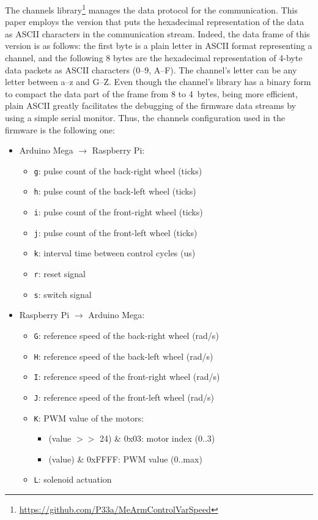 \documentclass[conference]{IEEEtran}
\begin{document}
The channels library\footnote{\url{https://github.com/P33a/MeArmControlVarSpeed}} manages the data protocol for the communication.
This paper employs the version that puts the hexadecimal representation of the data as ASCII characters in the communication stream.
Indeed, the data frame of this version is as follows: the first byte is a plain letter in ASCII format representing a channel, and the following 8 bytes are the hexadecimal representation of 4-byte data packets as ASCII characters (0--9, A--F).
The channel's letter can be any letter between a--z and G--Z.
Even though the channel's library has a binary form to compact the data part of the frame from 8 to 4~bytes, being more efficient, plain ASCII greatly facilitates the debugging of the firmware data streams by using a simple serial monitor.
Thus, the channels configuration used in the firmware is the following one:
\begin{itemize}[nosep]
\item Arduino Mega $\rightarrow$ Raspberry Pi:
  \begin{itemize}[nosep]
  \item \texttt{g}: pulse count of the back-right wheel (ticks)
  \item \texttt{h}: pulse count of the back-left wheel (ticks)
  \item \texttt{i}: pulse count of the front-right wheel (ticks)
  \item \texttt{j}: pulse count of the front-left wheel (ticks)
  \item \texttt{k}: interval time between control cycles (us)
  \item \texttt{r}: reset signal
  \item \texttt{s}: switch signal
  \end{itemize}
\item Raspberry Pi $\rightarrow$ Arduino Mega:
  \begin{itemize}[nosep]
  \item \texttt{G}: reference speed of the back-right wheel (rad/s)
  \item \texttt{H}: reference speed of the back-left wheel (rad/s)
  \item \texttt{I}: reference speed of the front-right wheel (rad/s)
  \item \texttt{J}: reference speed of the front-left wheel (rad/s)
  \item \texttt{K}: PWM value of the motors:
    \begin{itemize}[nosep]
    \item (value $>>$ 24) \& 0x03: motor index (0..3)
    \item (value) \& 0xFFFF: PWM value (0..max)
    \end{itemize}
  \item \texttt{L}: solenoid actuation
  \end{itemize}
\end{itemize}
\end{document}
